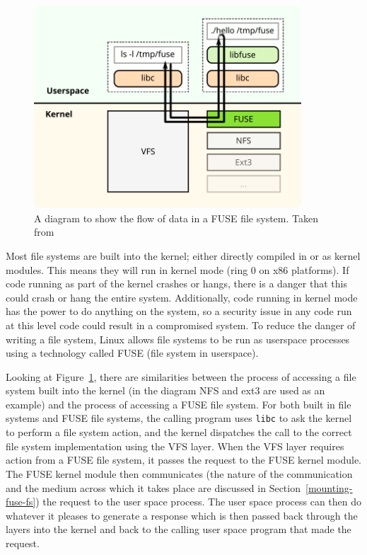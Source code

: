 \begin{figure}[h]
    \centering
    \includegraphics[width=10cm]{../data/fuse.pdf}
    \caption[FUSE Data Flow]{A diagram to show the flow of data in a FUSE file
        system. Taken from \cite{fuse-diagram-source}}
    \label{fig:fuse diagram}
\end{figure}

Most file systems are built into the kernel; either directly compiled in or as
kernel modules. This means they will run in kernel mode (ring 0 on x86
platforms). If code running as part of the kernel crashes or hangs, there is a
danger that this could crash or hang the entire system. Additionally, code
running in kernel mode has the power to do anything on the system, so a
security issue in any code run at this level code could result in a compromised
system. To reduce the danger of writing a file system, Linux allows file
systems to be run as userspace processes using a technology called
FUSE \cite{kernel-fuse} (file system in userspace).

Looking at Figure~\ref{fig:fuse diagram}, there are similarities between the
process of accessing a file system built into the kernel (in the diagram NFS
and ext3 are used as an example) and the process of accessing a FUSE file
system. For both built in file systems and FUSE file systems, the calling
program uses \texttt{libc} to ask the kernel to perform a file system action,
and the kernel dispatches the call to the correct file system implementation
using the VFS layer. When the VFS layer requires action from a FUSE file
system, it passes the request to the FUSE kernel module. The FUSE kernel module
then communicates (the nature of the communication and the medium across which
it takes place are discussed in Section~\ref{mounting-fuse-fs}) the request to
the user space process. The user space process can then do whatever it pleases
to generate a response which is then passed back through the layers into the
kernel and back to the calling user space program that made the request.

